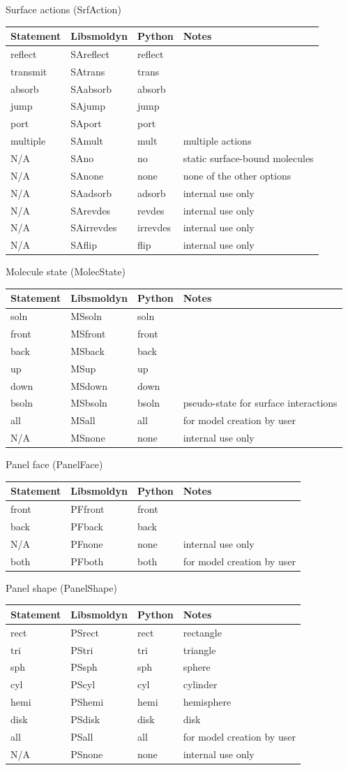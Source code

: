 \documentclass {book}
\begin{document}
Surface actions (SrfAction)
\begin{longtable}[c]{llll}
Statement & Libsmoldyn & Python & Notes\\
\hline
reflect & SAreflect & reflect\\
transmit & SAtrans & trans\\
absorb & SAabsorb & absorb\\
jump & SAjump & jump\\
port & SAport & port\\
multiple & SAmult & mult & multiple actions\\
N/A & SAno & no & static surface-bound molecules\\
N/A & SAnone & none & none of the other options\\
N/A & SAadsorb & adsorb & internal use only\\
N/A & SArevdes & revdes & internal use only\\
N/A & SAirrevdes & irrevdes & internal use only\\
N/A & SAflip & flip & internal use only
\end{longtable}

Molecule state (MolecState)
\begin{longtable}[c]{llll}
Statement & Libsmoldyn & Python & Notes\\
\hline
soln & MSsoln & soln\\
front & MSfront & front\\
back & MSback & back\\
up & MSup & up\\
down & MSdown & down\\
bsoln & MSbsoln & bsoln & pseudo-state for surface interactions\\
all & MSall & all & for model creation by user\\
N/A & MSnone & none & internal use only
\end{longtable}

Panel face (PanelFace)
\begin{longtable}[c]{llll}
Statement & Libsmoldyn & Python & Notes\\
\hline
front & PFfront & front\\
back & PFback & back\\
N/A & PFnone & none & internal use only\\
both & PFboth & both & for model creation by user
\end{longtable}

Panel shape (PanelShape)
\begin{longtable}[c]{llll}
Statement & Libsmoldyn & Python & Notes\\
\hline
rect & PSrect & rect & rectangle\\
tri & PStri & tri & triangle\\
sph & PSsph & sph & sphere\\
cyl & PScyl & cyl & cylinder\\
hemi & PShemi & hemi & hemisphere\\
disk & PSdisk & disk & disk\\
all & PSall & all & for model creation by user\\
N/A & PSnone & none & internal use only
\end{longtable}
\end{document}
